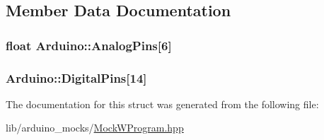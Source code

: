 \subsection{Member Data Documentation}
\hypertarget{struct_arduino_a344478f98fe14a78faa30bb694d7b28d}{
\subsubsection[{Analog\-Pins}]{\setlength{\rightskip}{0pt plus 5cm}float Arduino\-::\-Analog\-Pins\mbox{[}6\mbox{]}}}\label{struct_arduino_a344478f98fe14a78faa30bb694d7b28d}
\hypertarget{struct_arduino_ae607ad57ed2b574c1db0e298d1700154}{
\subsubsection[{Digital\-Pins}]{ Arduino\-::\-Digital\-Pins\mbox{[}14\mbox{]}}}\label{struct_arduino_ae607ad57ed2b574c1db0e298d1700154}


The documentation for this struct was generated from the following file\-:\begin{DoxyCompactItemize}
\item 
lib/arduino\-\_\-mocks/\hyperlink{_mock_w_program_8hpp}{Mock\-W\-Program.\-hpp}\end{DoxyCompactItemize}
